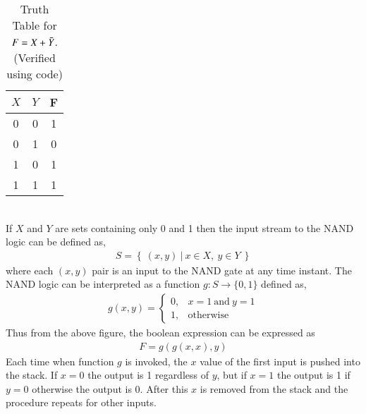 \documentclass[journal,12pt,twocolumn]{IEEEtran}
\begin{document}
\begin{table}[h]
    \centering
    \begin{tabular}{|c|c|c|}
    \hline
    $X$&$Y$&F  \\
    \hline
    0&0&1\\
    0&1&0\\
    1&0&1\\
    1&1&1\\
    \hline
    \end{tabular}
    \caption{Truth Table for $F = X + \Bar{Y}$. (Verified using code)}
\end{table}
\\
If ${X}$ and ${Y}$ are sets containing only 0 and 1 then the input stream to the NAND logic can be defined as,
\begin{align}
    S = \left\{ \ (x,y) \ | \  x \in X, \  y\in Y \ \right \}
\end{align}
where each $(x,y)$ pair is an input to the NAND gate at any time instant.
The NAND logic can be interpreted as a function $g:S \rightarrow \{0,1\}$ defined as,
\begin{align}
 g(x,y) = 
 \begin{cases}
 0, & x = 1  \  \text{and} \ y = 1 \\
 1, & \text{otherwise}
 \end{cases}
\end{align}
 Thus from the above figure, the boolean expression can be expressed as
\begin{align}
    F = g(g(x,x),y)
\end{align}
Each time when function $g$ is invoked, the $x$ value of the first input is pushed into the stack. If $x = 0$ the output is 1 regardless of $y$, but if $x = 1$ the output is 1 if $y = 0$ otherwise the output is 0. After this $x$ is removed from the stack and the procedure repeats for other inputs.
\end{document}
